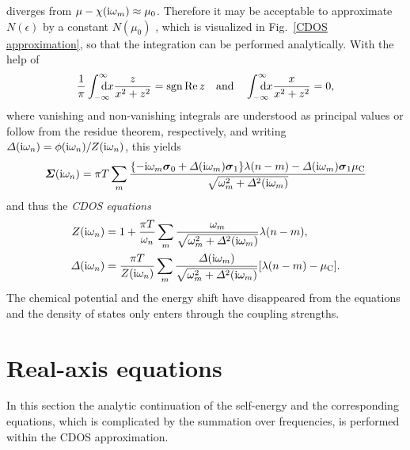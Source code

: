 diverges from $\mu - \chi(\mathrm i \omega_m) \approx \mu_0$. Therefore it may be
acceptable to approximate $N(\epsilon)$ by a constant $N(\mu_0)$ \cites [below
Eq.~26]{Allen76} [17]{AllenMitrovic82} [Section~II.B]{MargineGiustino13}, which
is visualized in Fig.~\ref{CDOS approximation}, so that the integration can be
performed analytically. With the help of
%
\begin{equation} \label{integrals}
    \frac 1 \pi \int \from{-\infty} \till \infty \D x \frac z {x^2 + z^2}
    = \sgn \Re z
    \quad \text{and} \quad
    \int \from{-\infty} \till \infty \D x \frac x {x^2 + z^2} = 0,
\end{equation}
%
where vanishing and non-vanishing integrals are understood as 
principal values or follow from the residue theorem, respectively, and writing
$\varDelta(\mathrm i \omega_n) = \phi(\mathrm i \omega_n) / Z(\mathrm i \omega_n)$, this yields
%
\begin{equation*}
    \boldsymbol {\varSigma}(\mathrm i \omega_n)
    = \pi T \sum_m \frac{ \{
        - \mathrm i \omega_m \boldsymbol \sigma_0 + \varDelta(\mathrm i \omega_m) \boldsymbol \sigma_1
        \} \lambda(n - m)
        - \varDelta(\mathrm i \omega_m) \boldsymbol \sigma_1 \mu \sb{\text{C}} }
        { \sqrt{\omega_m^2 + \varDelta^2(\mathrm i \omega_m)} }
\end{equation*}
%
and thus the \emph{CDOS  equations}
%
\begin{subequations} \label{CDOS Eliashberg equations}
    \begin{align}
        Z(\mathrm i \omega_n) &= 1 + \frac{\pi T}{\omega_n} \sum_m
        \frac{\omega_m}{\sqrt{\omega_m^2 + \varDelta^2(\mathrm i \omega_m)}}
        \lambda(n - m),
        \\
        \varDelta(\mathrm i \omega_n) &= \frac{\pi T}{Z(\mathrm i \omega_n)} \sum_m
        \frac{\varDelta(\mathrm i \omega_m)}{\sqrt{\omega_m^2 + \varDelta^2(\mathrm i \omega_m)}}
        [\lambda(n - m) - \mu \sb{\text{C}}].
    \end{align}
\end{subequations}
%
The chemical potential and the energy shift have disappeared from the equations
and the density of states only enters through the coupling strengths.

\section{Real-axis equations}

In this section the analytic continuation of the self-energy and the
corresponding  equations, which is complicated by the summation
over  frequencies, is performed within the CDOS approximation.

